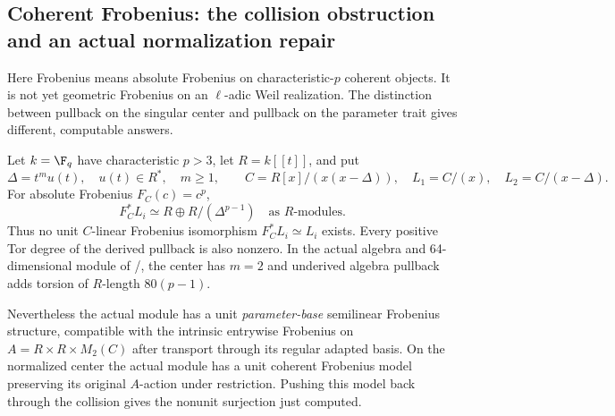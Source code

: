 \subsection{Coherent Frobenius: the collision obstruction and an actual normalization repair}
Here Frobenius means absolute Frobenius on characteristic-$p$ coherent
objects. It is not yet geometric Frobenius on an $\ell$-adic Weil
realization. The distinction between pullback on the singular center
and pullback on the parameter trait gives different, computable answers.

\begin{finding}\label{f:coherentfrobenius}
Let $k=\F_q$ have characteristic $p>3$, let $R=k[[t]]$, and put
\[
 \Delta=t^m u(t),\quad u(t)\in R^*,\quad m\ge1,\qquad
 C=R[x]/(x(x-\Delta)),\quad L_1=C/(x),\quad L_2=C/(x-\Delta).
\]
For absolute Frobenius $F_C(c)=c^p$,
\[
 F_C^*L_i\simeq R\oplus R/(\Delta^{p-1})
 \quad\text{as }R\text{-modules}.
\]
Thus no unit $C$-linear Frobenius isomorphism $F_C^*L_i\simeq L_i$
exists. Every positive Tor degree of the derived pullback is also
nonzero. In the actual algebra and 64-dimensional module of
/, the center has $m=2$ and underived algebra
pullback adds torsion of $R$-length $80(p-1)$.

Nevertheless the actual module has a unit \emph{parameter-base}
semilinear Frobenius structure, compatible with the intrinsic
entrywise Frobenius on $A=R\times R\times M_2(C)$ after transport
through its regular adapted basis. On the normalized center the
actual module has a unit coherent Frobenius model preserving its
original $A$-action under restriction. Pushing this model back through
the collision gives the nonunit surjection just computed.
\end{finding}
